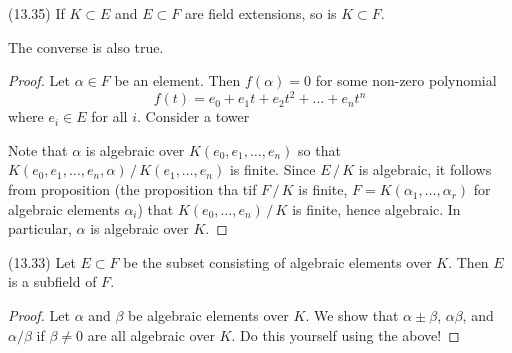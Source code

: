 \vspace{2ex}
\begin{prop}
(13.35) If $K\subset E$ and $E\subset F$ are field extensions, so is $K\subset F$. 
\end{prop}
\vspace{2ex}
\begin{rmk}
The converse is also true.
\begin{center}
\end{center}
\end{rmk}
\vspace{2ex}
\begin{proof}
Let $\alpha \in F$ be an element. Then $f(\alpha )=0$ for some non-zero polynomial
\[f(t)=e_0+e_1t+e_2t^2+\ldots +e_{n}t^{n}\]
where $e_{i}\in E$ for all $i$. Consider a tower
\begin{center}
\end{center}
Note that $\alpha $ is algebraic over $K(e_0,e_1,\ldots ,e_{n})$ so that $K(e_0,e_1,\ldots ,e_{n},\alpha )\,/\,K(e_1,\ldots ,e_{n})$ is finite. Since $E\,/\,K$ is algebraic, it follows from proposition (the proposition tha tif $F\,/\,K$ is finite, $F=K(\alpha_1,\ldots ,\alpha _{r})$ for algebraic elements $\alpha _{i}$) that $K(e_0,\ldots ,e_{n})\,/\,K$ is finite, hence algebraic. In particular, $\alpha $ is algebraic over $K$.
\end{proof}
\vspace{2ex}
\begin{prop}
(13.33) Let $E\subset F$ be the subset consisting of algebraic elements over $K$. Then $E$ is a subfield of $F$. 
\end{prop}
\vspace{2ex}
\begin{proof}
Let $\alpha $ and $\beta $ be algebraic elements over $K$. We show that $\alpha \pm \beta $, $\alpha \beta $, and $\alpha /\beta $ if $\beta \ne 0$ are all algebraic over $K$. Do this yourself using the above!
\end{proof}
\vspace{2ex}
